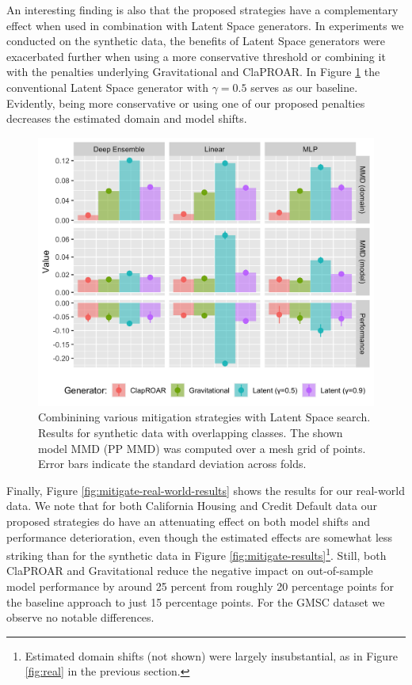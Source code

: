 \documentclass[conference,final,]{IEEEtran}
\theoremstyle{definition}
\theoremstyle{definition}
\theoremstyle{definition}
\theoremstyle{definition}
\theoremstyle{remark}
\begin{document}
An interesting finding is also that the proposed strategies have a complementary effect when used in combination with Latent Space generators. In experiments we conducted on the synthetic data, the benefits of Latent Space generators were exacerbated further when using a more conservative threshold or combining it with the penalties underlying Gravitational and ClaPROAR. In Figure \ref{fig:mitigate-latent-results} the conventional Latent Space generator with \(\gamma=0.5\) serves as our baseline. Evidently, being more conservative or using one of our proposed penalties decreases the estimated domain and model shifts.

\begin{figure}

{\centering \includegraphics[width=0.9\linewidth]{www/mitigation_synthetic_latent_results} 

}

\caption{Combinining various mitigation strategies with Latent Space search. Results for synthetic data with overlapping classes. The shown model MMD (PP MMD) was computed over a mesh grid of points. Error bars indicate the standard deviation across folds.}\label{fig:mitigate-latent-results}
\end{figure}

Finally, Figure \ref{fig:mitigate-real-world-results} shows the results for our real-world data. We note that for both California Housing and Credit Default data our proposed strategies do have an attenuating effect on both model shifts and performance deterioration, even though the estimated effects are somewhat less striking than for the synthetic data in Figure \ref{fig:mitigate-results}\footnote{Estimated domain shifts (not shown) were largely insubstantial, as in Figure \ref{fig:real} in the previous section.}. Still, both ClaPROAR and Gravitational reduce the negative impact on out-of-sample model performance by around 25 percent from roughly 20 percentage points for the baseline approach to just 15 percentage points. For the GMSC dataset we observe no notable differences.
\end{document}
